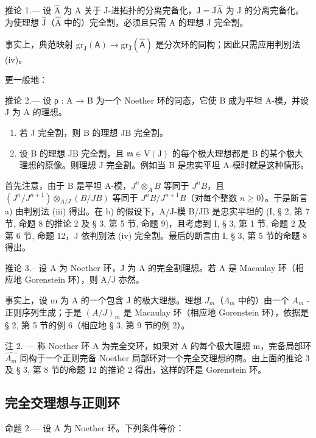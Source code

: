 推论 1.--- 设 \(\widehat{\mathrm{A}}\) 为 A 关于 J-进拓扑的分离完备化，\(\widehat{\mathrm{J}} = \mathrm{J}\widehat{\mathrm{A}}\) 为 J 的分离完备化。为使理想 \(\widehat{\mathrm{J}}\)（\(\widehat{\mathrm{A}}\) 中的）完全割，必须且只需 A 的理想 J 完全割。

事实上，典范映射 \(\mathrm{gr}_{\mathrm{J}}(\mathsf{A}) \to \mathrm{gr}_{\widehat{\mathrm{J}}}(\widehat{\mathsf{A}})\) 是分次环的同构；因此只需应用判别法 (iv)。

更一般地：

推论 2.--- 设 ρ : A → B 为一个 Noether 环的同态，它使 B 成为平坦 A-模，并设 J 为 A 的理想。

\begin{enumerate}
\def\labelenumi{\alph{enumi})}
\item
  若 J 完全割，则 B 的理想 JB 完全割。
\item
  设 B 的理想 JB 完全割，且 \(\mathfrak{m} \in \mathrm{V}(\mathrm{J})\) 的每个极大理想都是 B 的某个极大理想的原像。则理想 J 完全割。例如当 B 是忠实平坦 A-模时就是这种情形。
\end{enumerate}

首先注意，由于 B 是平坦 A-模，\(J^n \otimes_A B\) 等同于 \(J^n B\)，且 \((J^n / J^{n+1}) \otimes_{A/J} (B/JB)\) 等同于 \(J^n B / J^{n+1} B\)（对每个整数 \(n \geqslant 0\)）。于是断言 a) 由判别法 (iii) 得出。在 b) 的假设下，A/J-模 B/JB 是忠实平坦的 (I, § 2, 第 7 节, 命题 8 的推论 2 及 § 3, 第 5 节, 命题 9)，且考虑到 I, § 3, 第 1 节, 命题 2 及第 6 节, 命题 12，J 依判别法 (iv) 完全割。最后的断言由 I, § 3, 第 5 节的命题 8 得出。

推论 3.-- 设 A 为 Noether 环，J 为 A 的完全割理想。若 A 是 Macaulay 环（相应地 Gorenstein 环），则 A/J 亦然。

事实上，设 m 为 A 的一个包含 J 的极大理想。理想 \(J_{m}\)（\(\Lambda_{m}\) 中的）由一个 \(A_{m}\) -正则序列生成；于是 \((A/J)_{m}\) 是 Macaulay 环（相应地 Gorenstein 环），依据是 § 2, 第 5 节的例 6（相应地 § 3, 第 9 节的例 2）。

注 2. — 称 Noether 环 A 为完全交环，如果对 A 的每个极大理想 m，完备局部环 \(\widehat{A_{m}}\) 同构于一个正则完备 Noether 局部环对一个完全交理想的商。由上面的推论 3 及 § 3, 第 8 节的命题 12 的推论 2 得出，这样的环是 Gorenstein 环。

\subsection{完全交理想与正则环}

命题 2.--- 设 A 为 Noether 环。下列条件等价：

